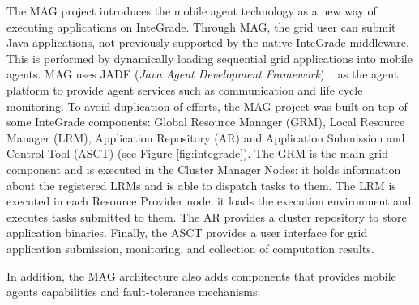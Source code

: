 \documentclass{cpeauth}
\begin{document}
The MAG project \cite{lopes05} introduces the mobile agent technology as a new way
of executing applications on InteGrade. Through MAG, the grid user can submit
Java applications, not previously supported by the native InteGrade middleware. This is
performed by dynamically loading sequential grid applications into mobile
agents. MAG uses JADE (\emph{Java Agent Development Framework}) ~\cite{jade} as the agent
platform to provide agent services such as communication and life cycle
monitoring. 
To avoid duplication of efforts, the MAG project was built on top of
some InteGrade components: Global Resource Manager (GRM), Local Resource
Manager (LRM), Application Repository (AR) and Application Submission and
Control Tool (ASCT) (see Figure \ref{fig:integrade}). 
The GRM is the main grid component and is executed
in the Cluster Manager Nodes; it holds information about the registered
LRMs and is able to dispatch tasks to them. The LRM is executed in
each Resource Provider node; it loads the execution environment and
executes tasks submitted to them. The AR provides a cluster repository to
store application binaries. Finally, the ASCT provides a user interface for grid application submission,  
monitoring, and collection of computation results.

In addition, the MAG architecture also adds components that provides
mobile agents capabilities and fault-tolerance mechanisms:
\end{document}
